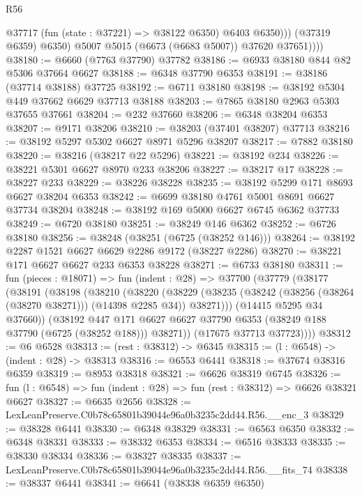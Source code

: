 \begin{lexlean}{R56}
\begin{coremodule}
                  @37717 (fun (state : @37221) => @38122 @6350) @6403 @6350)))
              (@37319 @6359)
              @6350)
            @5007
            @5015
            (@6673 (@6683 @5007))
            @37620
            @37651))))
@38180 := @6660 (@7763 @37790) @37782
@38186 := @6933 @38180 @844 @82 @5306 @37664 @6627
@38188 := @6348 @37790 @6353
@38191 := @38186 (@37714 @38188) @37725
@38192 := @6711 @38180
@38198 := @38192 @5304 @449 @37662 @6629 @37713 @38188
@38203 := @7865 @38180 @2963 @5303 @37655 @37661
@38204 := @232 @37660
@38206 := @6348 @38204 @6353
@38207 := @9171 @38206
@38210 := @38203 (@37401 @38207) @37713
@38216 := @38192 @5297 @5302 @6627 @8971 @5296 @38207
@38217 := @7882 @38180
@38220 := @38216 (@38217 @22 @5296)
@38221 := @38192 @234
@38226 := @38221 @5301 @6627 @8970 @233 @38206
@38227 := @38217 @17
@38228 := @38227 @233
@38229 := @38226 @38228
@38235 := @38192 @5299 @171 @8693 @6627 @38204 @6353
@38242 := @6699 @38180 @4761 @5001 @8691 @6627 @37734 @38204
@38248 := @38192 @169 @5000 @6627 @6745 @6362 @37733
@38249 := @6720 @38180
@38251 := @38249 @146 @6362
@38252 := @6726 @38180
@38256 := @38248 (@38251 (@6725 (@38252 @146)))
@38264 := @38192 @2287 @1521 @6627 @6629 @2286 @9172 (@38227 @2286)
@38270 := @38221 @171 @6627 @6627 @233 @6353 @38228
@38271 := @6733 @38180
@38311 := fun (pieces : @18071) =>
  fun (indent : @28) =>
  @37700
    (@37779
      (@38177
        (@38191
          (@38198
            (@38210
              (@38220
                (@38229
                  (@38235 (@38242 (@38256 (@38264 (@38270 @38271))) (@14398 @2285 @34)) @38271)))
              (@14415 @5295 @34 @37660))
            (@38192
              @447
              @171
              @6627
              @6627
              @37790
              @6353
              (@38249 @188 @37790 (@6725 (@38252 @188)))
              @38271))
          (@17675 @37713 @37723))))
@38312 := @6 @6528
@38313 := (rest : @38312) -> @6345
@38315 := (l : @6548) -> (indent : @28) -> @38313
@38316 := @6553 @6441
@38318 := @37674 @38316 @6359
@38319 := @8953 @38318
@38321 := @6626 @38319 @6745
@38326 := fun (l : @6548) => fun (indent : @28) => fun (rest : @38312) => @6626 @38321 @6627
@38327 := @6635 @2656
@38328 := LexLeanPreserve.C0b78c65801b39044e96a0b3235c2dd44.R56.__enc_3
@38329 := @38328 @6441
@38330 := @6348 @38329
@38331 := @6563 @6350
@38332 := @6348 @38331
@38333 := @38332 @6353
@38334 := @6516 @38333
@38335 := @38330 @38334
@38336 := @38327 @38335
@38337 := LexLeanPreserve.C0b78c65801b39044e96a0b3235c2dd44.R56.__fits_74
@38338 := @38337 @6441
@38341 := @6641 (@38338 @6359 @6350)

\end{coremodule}
\end{lexlean}
